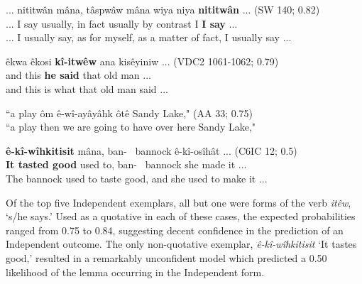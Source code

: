     \begin{exe}
    \ex
    \gll ... nititwân mâna, tâspwâw mâna wiya niya \textbf{nititwân} ... \tiny{(SW 140; 0.82)}\\
         ... {I say} usually, {in fact} {usually} {by contrast} {I} {\textbf{I say}} ... \\
    \trans ... I usually say, as for myself, as a matter of fact, I usually say ... \tiny{\citep[76]{Whitecalf1993}} 
    \label{ic2}
    \end{exe}

    \begin{exe}
    \ex
    \gll êkwa êkosi \textbf{kî-itwêw} ana kisêyiniw ... \tiny{(VDC2 1061-1062; 0.79)}\\
         and this \textbf{he said} that {old man} ... \\
    \trans and this is what that old man said ... \tiny{\citep[106-107]{VandallDouquette1987}} 
    \label{ic3}
    \end{exe}

    \begin{exe}
    \ex
    \gll ``a play ôm { } ê-wî-ayâyâhk {   } ôtê { } Sandy Lake," \tiny{(AA 33; 0.75)}\\
    ``a play then { } {we are going to have} {   } {over here} { } Sandy Lake,"\\
    \label{ic4}
    \end{exe}

    \begin{exe}
    \ex
    \gll \textbf{ê-kî-wîhkitisit} mâna, ban-~ bannock ê-kî-osîhât ... \tiny{(C6IC 12; 0.5)}\\
         {\textbf{It tasted good}} {used to}, ban-~ bannock {she made it} ... \\
    \trans The bannock used to taste good, and she used to make it  ... \tiny{\citep[148]{Bearetal1992}}
    \label{ic5}
    \end{exe}
    
    Of the top five Independent exemplars, all but one were forms of the verb \textit{itêw}, `s/he says.' Used as a quotative in each of these cases, the expected probabilities ranged from 0.75 to 0.84, suggesting decent confidence in the prediction of an Independent outcome. The only non-quotative exemplar, \textit{ê-kî-wîhkitisit} `It tastes good,' resulted in a remarkably unconfident model which predicted a 0.50 likelihood of the lemma occurring in the Independent form. 
    
